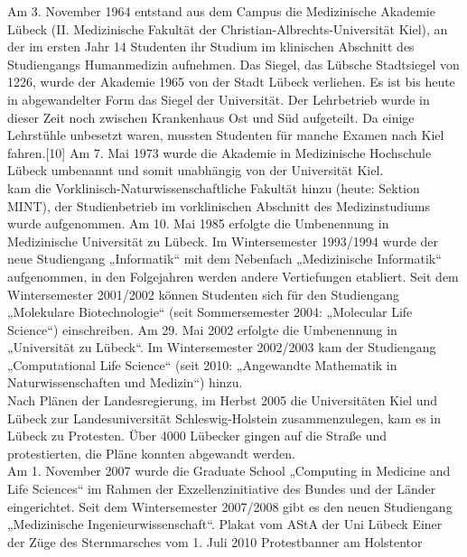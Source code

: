 \documentclass[a4paper]{article}
\begin{document}
\noindent Am 3. November 1964 entstand aus dem Campus die Medizinische Akademie Lübeck (II. Medizinische Fakultät der Christian-Albrechts-Universität Kiel), an der im ersten Jahr 14 Studenten ihr Studium im klinischen Abschnitt des Studiengangs Humanmedizin aufnehmen. Das Siegel, das Lübsche Stadtsiegel von 1226, wurde der Akademie 1965 von der Stadt Lübeck verliehen. Es ist bis heute in abgewandelter Form das Siegel der Universität. Der Lehrbetrieb wurde in dieser Zeit noch zwischen Krankenhaus Ost und Süd aufgeteilt. Da einige Lehrstühle unbesetzt waren, mussten Studenten für manche Examen nach Kiel fahren.[10] Am 7. Mai 1973 wurde die Akademie in Medizinische Hochschule Lübeck umbenannt und somit unabhängig von der Universität Kiel.\\

 kam die Vorklinisch-Naturwissenschaftliche Fakultät hinzu (heute: Sektion MINT), der Studienbetrieb im vorklinischen Abschnitt des Medizinstudiums wurde aufgenommen. Am 10. Mai 1985 erfolgte die Umbenennung in Medizinische Universität zu Lübeck. Im Wintersemester 1993/1994 wurde der neue Studiengang „Informatik“ mit dem Nebenfach „Medizinische Informatik“ aufgenommen, in den Folgejahren werden andere Vertiefungen etabliert. Seit dem Wintersemester 2001/2002 können Studenten sich für den Studiengang „Molekulare Biotechnologie“ (seit Sommersemester 2004: „Molecular Life Science“) einschreiben. Am 29. Mai 2002 erfolgte die Umbenennung in „Universität zu Lübeck“. Im Wintersemester 2002/2003 kam der Studiengang „Computational Life Science“ (seit 2010: „Angewandte Mathematik in Naturwissenschaften und Medizin“) hinzu.\\

\noindent Nach Plänen der Landesregierung, im Herbst 2005 die Universitäten Kiel und Lübeck zur Landesuniversität Schleswig-Holstein zusammenzulegen, kam es in Lübeck zu Protesten. Über 4000 Lübecker gingen auf die Straße und protestierten, die Pläne konnten abgewandt werden.\\

\noindent Am 1. November 2007 wurde die Graduate School „Computing in Medicine and Life Sciences“ im Rahmen der Exzellenzinitiative des Bundes und der Länder eingerichtet. Seit dem Wintersemester 2007/2008 gibt es den neuen Studiengang „Medizinische Ingenieurwissenschaft“.
Plakat vom AStA der Uni Lübeck
Einer der Züge des Sternmarsches vom 1. Juli 2010
Protestbanner am Holstentor\\
\end{document}
